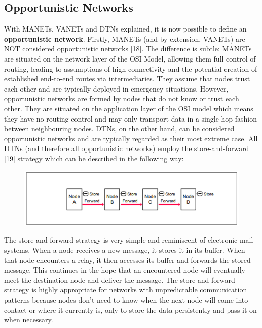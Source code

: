 \documentclass{article}
\begin{document}
\subsection{Opportunistic Networks}
With MANETs, VANETs and DTNs explained, it is now possible to define an \textbf{opportunistic network}. Firstly, MANETs (and by extension, VANETs) are NOT considered opportunistic networks [18]. The difference is subtle: MANETs are situated on the network layer of the OSI Model, allowing them full control of routing, leading to assumptions of high-connectivity and the potential creation of established end-to-end routes via intermediaries. They assume that nodes trust each other and are typically deployed in emergency situations. However, opportunistic networks are formed by nodes that do not know or trust each other. They are situated on the application layer of the OSI model which means they have no routing control and may only transport data in a single-hop fashion between neighbouring nodes. DTNs, on the other hand, can be considered opportunistic networks and are typically regarded as their most extreme case. All DTNs (and therefore all opportunistic networks) employ the store-and-forward [19] strategy which can be described in the following way:

\begin{figure}[h!]
\captionsetup{justification=centering, font=footnotesize}
\centering
  \includegraphics[width=.75\linewidth]{Screenshots/StoreAndForward.png}
  \label{fig:test1}
\end{figure}

\noindent The store-and-forward strategy is very simple and reminiscent of electronic mail systems. When a node receives a new message, it stores it in its buffer. When that node encounters a relay, it then accesses its buffer and forwards the stored message. This continues in the hope that an encountered node will eventually meet the destination node and deliver the message. The store-and-forward strategy is highly appropriate for networks with unpredictable communication patterns because nodes don't need to know when the next node will come into contact or where it currently is, only to store the data persistently and pass it on when necessary.
\end{document}
